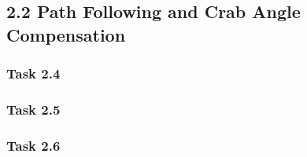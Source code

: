 \subsection*{2.2 Path Following and Crab Angle Compensation}
\subsubsection*{Task 2.4}
\subsubsection*{Task 2.5}
\subsubsection*{Task 2.6}